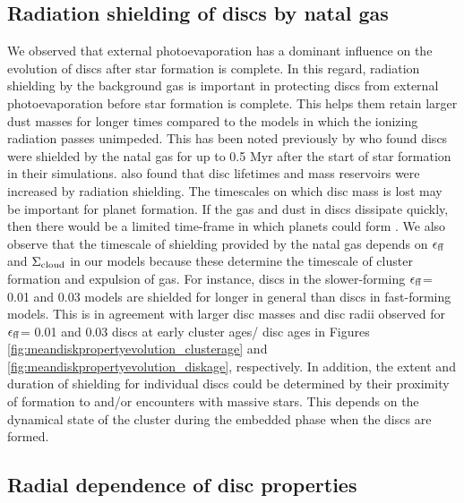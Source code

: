 \documentclass[fleqn,usenatbib]{mnras}
\newcommand\sfeff{\ensuremath{\epsilon_{\rm ff}}\xspace}   %
\newcommand\Sigmacloud{\ensuremath{\Sigma_{\rm cloud}}\xspace} %
\begin{document}
\subsection{Radiation shielding of discs by natal gas}
\label{subsec:shielding}
We observed that external photoevaporation has a dominant influence on the evolution of discs after star formation is complete. In this regard, radiation shielding by the background gas is important in protecting discs from external photoevaporation before star formation is complete. This helps them retain larger dust masses for longer times compared to the models in which the ionizing radiation passes unimpeded. This has been noted previously by \cite{Qiao2022MNRAS.512.3788Q} who found discs were shielded by the natal gas for up to 0.5 Myr after the start of star formation in their simulations. \cite{Wilhelm2023arXiv230203721W} also found that disc lifetimes and mass reservoirs were increased by radiation shielding. The timescales on which disc mass is lost may be important for planet formation. If the gas and dust in discs dissipate quickly, then there would be a limited time-frame in which planets could form \citep[see][]{Qiao2023MNRAS.522.1939Q}. We also observe that the timescale of shielding provided by the natal gas depends on \sfeff and \Sigmacloud in our models because these determine the timescale of cluster formation and expulsion of gas. For instance, discs in the slower-forming \sfeff = 0.01 and 0.03 models are shielded for longer in general than discs in fast-forming models. This is in agreement with larger disc masses and disc radii observed for \sfeff = 0.01 and 0.03 discs at early cluster ages/ disc ages in Figures \ref{fig:meandiskpropertyevolution_clusterage} and \ref{fig:meandiskpropertyevolution_diskage}, respectively. In addition, the extent and duration of shielding for individual discs could be determined by their proximity of formation to and/or encounters with massive stars. This depends on the dynamical state of the cluster during the embedded phase when the discs are formed.  

\subsection{Radial dependence of disc properties}
\label{subsec:radialdependence-discussion}
\end{document}
